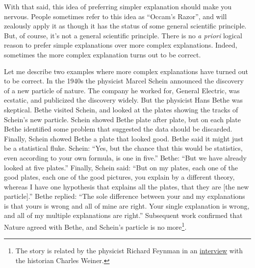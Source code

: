 \documentclass[a4paper,twoside,10pt]{book}
\begin{document}
With that said, this idea of preferring simpler explanation should make you nervous. People sometimes refer to this idea as ``Occam's Razor'', and will zealously apply it as though it has the status of some general scientific principle. But, of course, it's not a general scientific principle. There is no \textit{a priori} logical reason to prefer simple explanations over more complex explanations. Indeed, sometimes the more complex explanation turns out to be correct.

Let me describe two examples where more complex explanations have turned out to be correct. In the 1940s the physicist Marcel Schein announced the discovery of a new particle of nature. The company he worked for, General Electric, was ecstatic, and publicized the discovery widely. But the physicist Hans Bethe was skeptical. Bethe visited Schein, and looked at the plates showing the tracks of Schein's new particle. Schein showed Bethe plate after plate, but on each plate Bethe identified some problem that suggested the data should be discarded. Finally, Schein showed Bethe a plate that looked good. Bethe said it might just be a statistical fluke. Schein: ``Yes, but the chance that this would be statistics, even according to your own formula, is one in five.'' Bethe: ``But we have already looked at five plates.'' Finally, Schein said: ``But on my plates, each one of the good plates, each one of the good pictures, you explain by a different theory, whereas I have one hypothesis that explains all the plates, that they are [the new particle].'' Bethe replied: ``The sole difference between your and my explanations is that yours is wrong and all of mine are right. Your single explanation is wrong, and all of my multiple explanations are right.'' Subsequent work confirmed that Nature agreed with Bethe, and Schein's particle is no more\footnote{The story is related by the physicist Richard Feynman in an \href{https://www.aip.org/history-programs/niels-bohr-library/oral-histories/5020-4}{interview} with the historian Charles Weiner.}.
\end{document}
